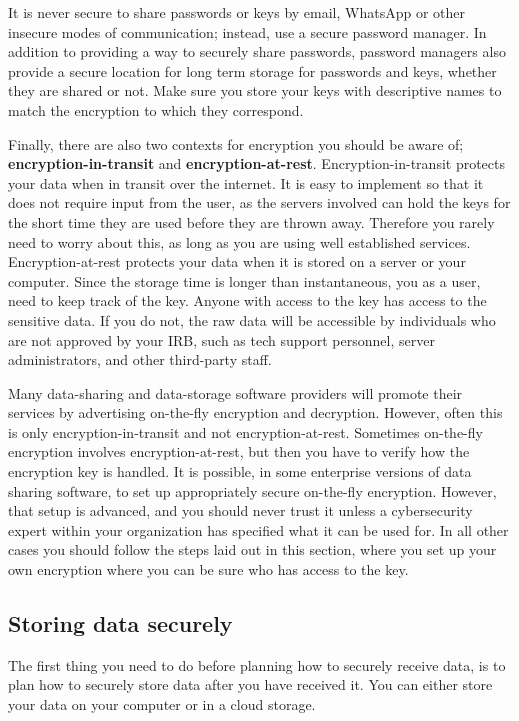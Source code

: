 It is never secure to share passwords or keys by email,
WhatsApp or other insecure modes of communication;
instead, use a secure password manager.
In addition to providing a way to securely share passwords,
password managers also provide a secure location
for long term storage for passwords and keys, whether they are shared or not.
Make sure you store your keys with descriptive names to match the encryption to which they correspond.

Finally, there are also two contexts for encryption you should be aware of;
\textbf{encryption-in-transit}
and \textbf{encryption-at-rest}.
Encryption-in-transit protects your data when in transit over the internet. 
It is easy to implement so that it does not require input from the user, 
as the servers involved can hold the keys for the short time they are used
before they are thrown away.
Therefore you rarely need to worry about this,
as long as you are using well established services.
Encryption-at-rest protects your data when it is stored on a server or your computer.
Since the storage time is longer than instantaneous,
you as a user, need to keep track of the key. 
Anyone with access to the key has access to the sensitive data.
If you do not, the raw data will be accessible by
individuals who are not approved by your IRB,
such as tech support personnel,
server administrators, and other third-party staff.

Many data-sharing and data-storage software providers will promote their services
by advertising on-the-fly encryption and decryption.
However, often this is only encryption-in-transit and not encryption-at-rest.
Sometimes on-the-fly encryption involves encryption-at-rest, 
but then you have to verify how the encryption key is handled.
It is possible, in some enterprise versions of data sharing software,
to set up appropriately secure on-the-fly encryption.
However, that setup is advanced, and you should never trust it
unless a cybersecurity expert within your organization
has specified what it can be used for.
In all other cases you should follow the steps laid out in this section,
where you set up your own encryption where you can be sure who has access to the key.


\subsection{Storing data securely}
The first thing you need to do before planning how to securely receive data, 
is to plan how to securely store data after you have received it.
You can either store your data on your computer or in a cloud storage.

